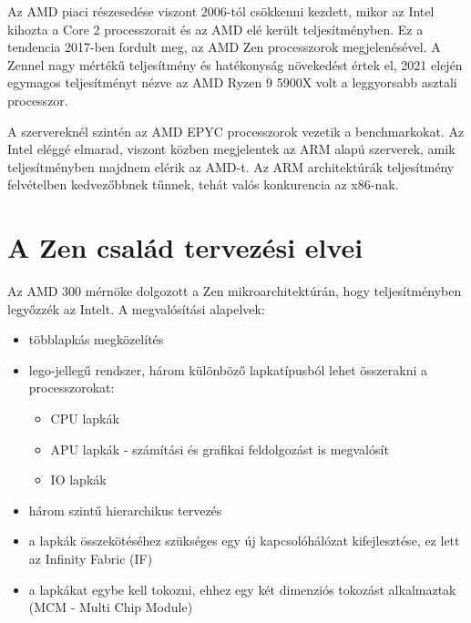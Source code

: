 Az AMD piaci részesedése viszont 2006-tól csökkenni kezdett, mikor az Intel kihozta a Core 2 processzorait és az AMD elé került teljesítményben.
Ez a tendencia 2017-ben fordult meg, az AMD Zen processzorok megjelenésével.
A Zennel nagy mértékű teljesítmény és hatékonyság növekedést értek el, 2021 elején egymagos teljesítményt nézve az AMD Ryzen 9 5900X volt a leggyorsabb asztali processzor.

A szervereknél szintén az AMD EPYC processzorok vezetik a benchmarkokat.
Az Intel eléggé elmarad, viszont közben megjelentek az ARM alapú szerverek, amik teljesítményben majdnem elérik az AMD-t.
Az ARM architektúrák teljesítmény felvételben kedvezőbbnek tűnnek, tehát valós konkurencia az x86-nak.

\section{A Zen család tervezési elvei}
Az AMD 300 mérnöke dolgozott a Zen mikroarchitektúrán, hogy teljesítményben legyőzzék az Intelt.
A megvalósítási alapelvek:
\begin{itemize}
    \item többlapkás megközelítés
    \item lego-jellegű rendszer, három különböző lapkatípusból lehet összerakni a processzorokat:
    \begin{itemize}
        \item CPU lapkák
        \item APU lapkák - számítási és grafikai feldolgozást is megvalósít
        \item IO lapkák
    \end{itemize}
    \item három szintű hierarchikus tervezés
    \item a lapkák összekötéséhez szükséges egy új kapcsolóhálózat kifejlesztése, ez lett az Infinity Fabric (IF)
    \item a lapkákat egybe kell tokozni, ehhez egy két dimenziós tokozást alkalmaztak (MCM - Multi Chip Module)
\end{itemize}

